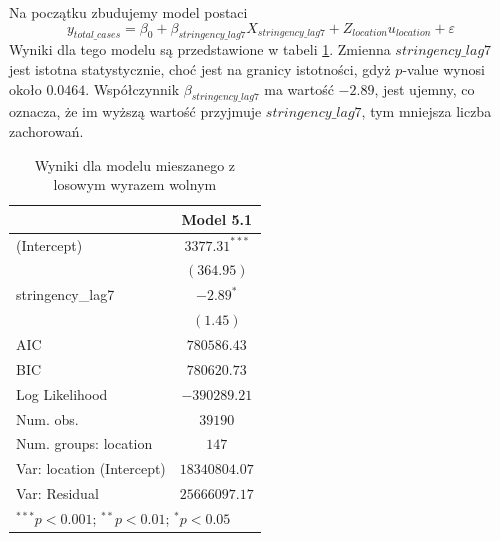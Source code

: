 \documentclass[12pt]{mwbk}
\theoremstyle{plain}
\theoremstyle{definition}
\theoremstyle{definition}
\begin{document}
Na początku zbudujemy model postaci
$$y_{total\_cases}=\beta_0+\beta_{stringency\_lag7} X_{stringency\_lag7}+Z_{location}u_{location}+\varepsilon$$
Wyniki dla tego modelu są przedstawione w tabeli \ref{table:mod5-intercept}. Zmienna $stringency\_lag7$ jest istotna statystycznie, choć jest na granicy istotności, gdyż $p$-value wynosi około $0.0464$. Współczynnik $\beta_{stringency\_lag7}$ ma wartość $-2.89$, jest ujemny, co oznacza, że im wyższą wartość przyjmuje $stringency\_lag7$, tym mniejsza liczba zachorowań.

\newpage
\begin{table}[!h]
	\begin{center}
		\begin{tabular}{l c}
			\hline
			& Model 5.1 \\
			\hline
			(Intercept)               & $3377.31^{***}$ \\
			& $(364.95)$      \\
			stringency\_lag7          & $-2.89^{*}$     \\
			& $(1.45)$        \\
			\hline
			AIC                       & $780586.43$     \\
			BIC                       & $780620.73$     \\
			Log Likelihood            & $-390289.21$    \\
			Num. obs.                 & $39190$         \\
			Num. groups: location     & $147$           \\
			Var: location (Intercept) & $18340804.07$   \\
			Var: Residual             & $25666097.17$   \\
			\hline
			\multicolumn{2}{l}{\scriptsize{$^{***}p<0.001$; $^{**}p<0.01$; $^{*}p<0.05$}}
		\end{tabular}
		\caption{Wyniki dla modelu mieszanego z losowym wyrazem wolnym}
		\label{table:mod5-intercept}
	\end{center}
\end{table}
\end{document}
